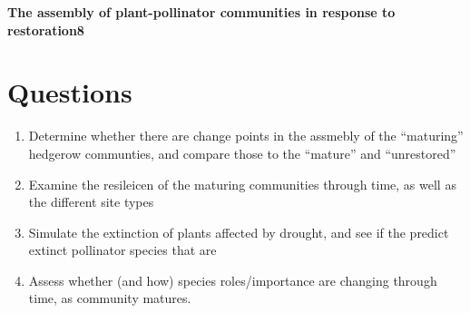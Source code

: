 \documentclass[12pt]{article}
\begin{document}
\begin{centering}
  \large {\bf The assembly of plant-pollinator communities in response
  to restoration8} \\
\end{centering}
\vspace{0.15in}


\section{Questions}
\begin{enumerate}
\item Determine whether there are change points in the assmebly of the
  ``maturing'' hedgerow communties, and compare those to the
  ``mature'' and ``unrestored''
\item Examine the resileicen of the maturing communities through time,
  as well as the different site types
\item Simulate the extinction of plants affected by drought, and see
  if the predict extinct pollinator species that are 
\item Assess whether (and how) species roles/importance are changing
  through time, as community matures. 
\end{enumerate}
\end{document}
